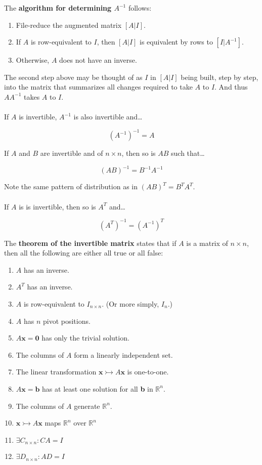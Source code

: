 \documentclass[12pt]{article}
\newcommand{\R}{\mathbb{R}}
\newcommand{\bt}[1]{\textbf{{#1}}}
\newcommand{\bm}[1]{\mathbf{{#1}}}
\begin{document}
The \textbf{algorithm for determining $A^{-1}$} follows:

\begin{enumerate}
    \item File-reduce the augmented matrix $[A | I]$.
    \item If $A$ is row-equivalent to $I$, then $[A | I]$ is equivalent by rows to $[I | A^{-1}]$.
    \item Otherwise, $A$ does not have an inverse.
\end{enumerate}

The second step above may be thought of as $I$ in $[A|I]$ being built, step by step, into the matrix that summarizes all changes
required to take $A$ to $I$. And thus $AA^{-1}$ takes $A$ to $I$. \\ \\

If $A$ is invertible, $A^{-1}$ is also invertible and\dots

$$(A^{-1})^{-1} = A$$

If $A$ and $B$ are invertible and of ${n\times n}$, then so is $AB$ such that\dots

$$(AB)^{-1} = B^{-1}A^{-1}$$

Note the same pattern of distribution as in $(AB)^T = B^TA^T$. \\ \\

If $A$ is is invertible, then so is $A^T$ and\dots

$$(A^T)^{-1} = (A^{-1})^T$$

The \textbf{theorem of the invertible matrix} states that if $A$ is a matrix of $n\times n$, then all the following are either all true or all false:

\begin{enumerate}
    \item $A$ has an inverse.
    \item $A^T$ has an inverse.
    \item $A$ is row-equivalent to $I_{n\times n}$. (Or more simply, $I_n$.)
    \item $A$ has $n$ pivot positions.
    \item $A\bm{x} = \bm{0}$ has only the trivial solution.
    \item The columns of $A$ form a linearly independent set.
    \item The linear transformation $\bm{x} \rightarrowtail A\bm{x}$ is one-to-one.
    \item $A\bm{x} = \bm{b}$ has at least one solution for all \bt{b} in $\R^n$.
    \item The columns of $A$ generate $\R^n$.
    \item $\bm{x} \rightarrowtail A\bm{x}$ maps $\R^n$ over $\R^n$
    \item $\exists C_{n\times n}: CA = I$
    \item $\exists D_{n\times n}: AD = I$
\end{enumerate}
\end{document}
